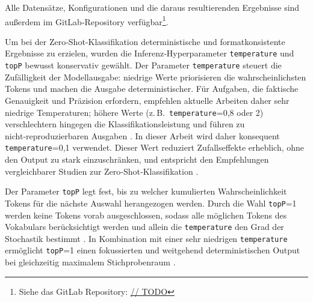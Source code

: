 Alle Datensätze, Konfigurationen und die daraus resultierenden
Ergebnisse sind außerdem im GitLab‑Repository verfügbar\footnote{Siehe das GitLab Repository: \hyperlink{// TODO}{// TODO}}.

Um bei der Zero‑Shot‑Klassifikation deterministische und formatkonsistente Ergebnisse zu erzielen, wurden die Inferenz‑Hyperparameter \texttt{temperature} und \texttt{topP} bewusst konservativ gewählt. Der Parameter \texttt{temperature} steuert die Zufälligkeit der Modellausgabe: niedrige Werte priorisieren die wahrscheinlichsten Tokens und machen die Ausgabe deterministischer. Für Aufgaben, die faktische Genauigkeit und Präzision erfordern, empfehlen aktuelle Arbeiten daher sehr niedrige Temperaturen; höhere Werte (z.\,B.\ \texttt{temperature}=0{,}8 oder 2) verschlechtern hingegen die Klassifikationsleistung und führen zu nicht‑reproduzierbaren Ausgaben \cite{renze2024effect,mu2024navigating}.
In dieser Arbeit wird daher konsequent \texttt{temperature}=0{,}1 verwendet. Dieser Wert reduziert Zufallseffekte erheblich, ohne den Output zu stark einzuschränken, und entspricht den Empfehlungen vergleichbarer Studien zur Zero‑Shot‑Klassifikation \cite{mu2024navigating}.

Der Parameter \texttt{topP} legt fest, bis zu welcher kumulierten Wahrscheinlichkeit Tokens für die nächste Auswahl herangezogen werden. Durch die Wahl \texttt{topP}=1 werden keine Tokens vorab ausgeschlossen, sodass alle möglichen Tokens des Vokabulars berücksichtigt werden und allein die \texttt{temperature} den Grad der Stochastik bestimmt \cite{renze2024effect}. In Kombination mit einer sehr niedrigen \texttt{temperature} ermöglicht \texttt{topP}=1 einen fokussierten und weitgehend deterministischen Output bei gleichzeitig maximalem Stichprobenraum \cite{mu2024navigating}.

